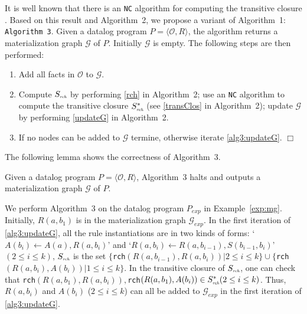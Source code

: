 \documentclass{article}
\begin{document}
It is well known that there is an \texttt{NC} algorithm for computing the transitive closure \cite{DBLP:conf/cie/Allender07}. Based on this result and Algorithm~2, we propose a variant of Algorithm~1:\\

\noindent\texttt{Algorithm~3}. Given a datalog program $P=\langle\mathcal{O}, R\rangle$, the algorithm
returns a materialization graph $\mathcal{G}$ of $P$. Initially $\mathcal{G}$ is empty. The following steps are then performed:
\begin{enumerate}[leftmargin=8ex,label=(\textit{Step \arabic*}),ref=Step~\arabic*]
\item Add all facts in $\mathcal{O}$ to $\mathcal{G}$.\label{alg3:addFacts}
\item Compute $S_{\textit{\tiny rch}}$ by performing \ref{rch} in Algorithm~2; use an \texttt{NC} algorithm to compute the transitive closure $S^*_{\textit{\tiny rch}}$ (see \ref{transClos} in Algorithm~2); update $\mathcal{G}$ by performing \ref{updateG}  in Algorithm~2.\label{alg3:updateG}
\item If no nodes can be added to $\mathcal{G}$ termine, otherwise iterate \ref{alg3:updateG}. \label{alg3:halt}\hfill$\Box$
\end{enumerate}




The following lemma shows the correctness of Algorithm~3.

\begin{lemma}
Given a datalog program $P=\langle\mathcal{O}, R\rangle$, Algorithm~3 halts and outputs a materialization graph $\mathcal{G}$ of $P$.
\end{lemma}

\begin{example}
We perform Algorithm~3 on the datalog program $P_{exp}$ in Example~\ref{exp:mg}. Initially, $R(a,b_1)$ is in the materialization graph $\mathcal{G}_{exp}$. In the first iteration of \ref{alg3:updateG}, all the rule instantiations are in two kinds of forms: `$A(b_{i})\leftarrow A(a),R(a,b_{i})$' and `$R(a,b_i)\leftarrow R(a,b_{i-1}),S(b_{i-1},b_i)$' $(2\leq i\leq k)$, $S_{\textit{\tiny rch}}$ is the set $\{$\texttt{rch}$(R(a,b_{i-1}), R(a,b_i))|2\leq i\leq k\}\cup\{$\texttt{rch}$(R(a,b_i), A(b_i))|1\leq i\leq k\}$. In the transitive closure of $S_{\textit{\tiny rch}}$,
one can check that \texttt{rch}$(R(a,b_1), R(a,b_i)),$\texttt{rch}$(R(a,b_1), A(b_i))\in S^*_{\textit{\tiny rch}}(2\leq i\leq k)$. Thus, $R(a,b_i)$ and $A(b_i)$ ($2\leq i\leq k$) can all be added to $\mathcal{G}_{exp}$ in the first iteration of \ref{alg3:updateG}.
\end{example}
\end{document}
